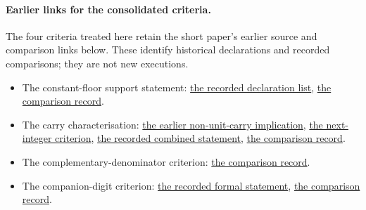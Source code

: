 \documentclass[11pt]{article}
\begin{document}
\paragraph{Earlier links for the consolidated criteria.}\label{long68:sec:short-criteria-sources}
The four criteria treated here retain the short paper's earlier source
and comparison links below. These identify historical declarations and
recorded comparisons; they are not new executions.
\begin{itemize}
\item The constant-floor support statement: \href{https://github.com/wcook04/plectis-erdos/blob/897f55801d7d184aaa2ce8fb19e7b701c9c23d94/evidence/erdos-68-factorial-denominator-irrationality.md#res-bandbreakpoint}{the recorded declaration list}, \href{https://github.com/wcook04/plectis-erdos/blob/897f55801d7d184aaa2ce8fb19e7b701c9c23d94/evidence/erdos-68-factorial-denominator-irrationality.md#res-bandbreakpoint-comparator}{the comparison record}.
\item The carry characterisation: \href{https://github.com/wcook04/plectis-erdos/blob/99f4bf47422abbd8757cbb22b50ba079d764d3a7/ErdosProblems/Erdos68/FactorialZeroPlateau.lean#L953}{the earlier non-unit-carry implication}, \href{https://github.com/wcook04/plectis-erdos/blob/99f4bf47422abbd8757cbb22b50ba079d764d3a7/ErdosProblems/Erdos68/FactorialZeroPlateau.lean#L1090}{the next-integer criterion}, \href{https://github.com/wcook04/plectis-erdos/blob/436f55ebdafa67e4af0fff79f621c13f2ded12bf/lean/ErdosProblems/Erdos68/PaperCompleteExisting.lean#L27}{the recorded combined statement}, \href{https://github.com/wcook04/plectis-erdos/blob/897f55801d7d184aaa2ce8fb19e7b701c9c23d94/evidence/erdos-68-factorial-denominator-irrationality.md#res-carry-characterization-comparator}{the comparison record}.
\item The complementary-denominator criterion: \href{https://github.com/wcook04/plectis-erdos/blob/897f55801d7d184aaa2ce8fb19e7b701c9c23d94/evidence/erdos-68-factorial-denominator-irrationality.md#res-global-complementary-criterion-comparator}{the comparison record}.
\item The companion-digit criterion: \href{https://github.com/wcook04/plectis-erdos/blob/436f55ebdafa67e4af0fff79f621c13f2ded12bf/lean/ErdosProblems/Erdos68/PaperCompleteExisting.lean#L45}{the recorded formal statement}, \href{https://github.com/wcook04/plectis-erdos/blob/897f55801d7d184aaa2ce8fb19e7b701c9c23d94/evidence/erdos-68-factorial-denominator-irrationality.md#res-companion-orbit-rationality-boundary-comparator}{the comparison record}.
\end{itemize}
\end{document}
